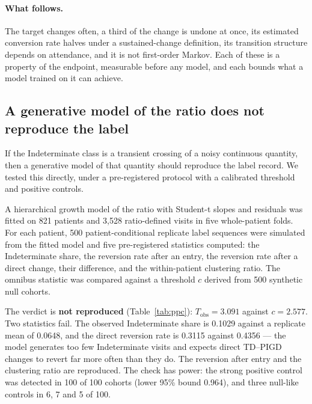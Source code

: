 \documentclass[11pt]{article}
\begin{document}
\paragraph{What follows.} The target changes often, a third of the change is
undone at once, its estimated conversion rate halves under a sustained-change
definition, its transition structure depends on attendance, and it is not
first-order Markov. Each of these is a property of the endpoint, measurable
before any model, and each bounds what a model trained on it can achieve.

\subsection{A generative model of the ratio does not reproduce the label}
\label{sec:ppc}

If the Indeterminate class is a transient crossing of a noisy continuous
quantity, then a generative model of that quantity should reproduce the label
record. We tested this directly, under a pre-registered protocol with a
calibrated threshold and positive controls.

A hierarchical growth model of the ratio with Student-t slopes and residuals was
fitted on 821 patients and 3,528 ratio-defined visits in five whole-patient
folds. For each patient, 500 patient-conditional replicate label sequences were
simulated from the fitted model and five pre-registered statistics computed: the
Indeterminate share, the reversion rate after an entry, the reversion rate after
a direct change, their difference, and the within-patient clustering ratio. The
omnibus statistic was compared against a threshold $c$ derived from 500 synthetic
null cohorts.

The verdict is \textbf{not reproduced} (Table~\ref{tab:ppc}):
$T_{\mathrm{obs}} = 3.091$ against $c = 2.577$. Two statistics fail. The observed
Indeterminate share is 0.1029 against a replicate mean of 0.0648, and the direct
reversion rate is 0.3115 against 0.4356 --- the model generates too few
Indeterminate visits and expects direct TD--PIGD changes to revert far more often
than they do. The reversion after entry and the clustering ratio are reproduced.
The check has power: the strong positive control was detected in 100 of 100
cohorts (lower 95\% bound 0.964), and three null-like controls in 6, 7 and 5 of
100.

\begin{table}[t]
\centering
\caption{Pre-registered posterior-predictive check of the label's dynamics under a
hierarchical growth model of the ratio with Student-t slopes and residuals (821
patients, 3,528 ratio-defined visits, 500 patient-conditional replicates). The
$z$ scores are capped at the resolution of the replicate distribution.}
\label{tab:ppc}
\small

\end{table}
\end{document}
